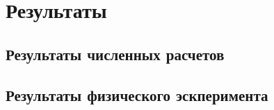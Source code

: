 \section{Результаты}
\label{sec:Chapter4} 

\subsection{Результаты численных расчетов}
\subsection{Результаты физического эскперимента}

\newpage
